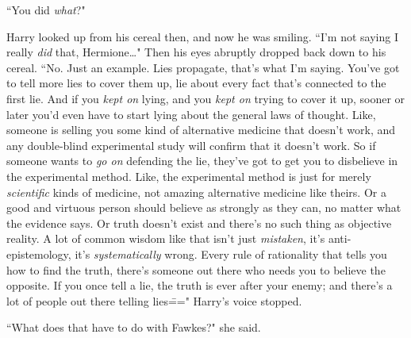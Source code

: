 ``You did \emph{what}?"

Harry looked up from his cereal then, and now he was smiling. ``I'm not saying I really \emph{did} that, Hermione{\ldots}" Then his eyes abruptly dropped back down to his cereal. ``No. Just an example. Lies propagate, that's what I'm saying. You've got to tell more lies to cover them up, lie about every fact that's connected to the first lie. And if you \emph{kept on} lying, and you \emph{kept on} trying to cover it up, sooner or later you'd even have to start lying about the general laws of thought. Like, someone is selling you some kind of alternative medicine that doesn't work, and any double-blind experimental study will confirm that it doesn't work. So if someone wants to \emph{go on} defending the lie, they've got to get you to disbelieve in the experimental method. Like, the experimental method is just for merely \emph{scientific} kinds of medicine, not amazing alternative medicine like theirs. Or a good and virtuous person should believe as strongly as they can, no matter what the evidence says. Or truth doesn't exist and there's no such thing as objective reality. A lot of common wisdom like that isn't just \emph{mistaken}, it's anti-epistemology, it's \emph{systematically} wrong. Every rule of rationality that tells you how to find the truth, there's someone out there who needs you to believe the opposite. If you once tell a lie, the truth is ever after your enemy; and there's a lot of people out there telling lies\===" Harry's voice stopped.

``What does that have to do with Fawkes?" she said.

